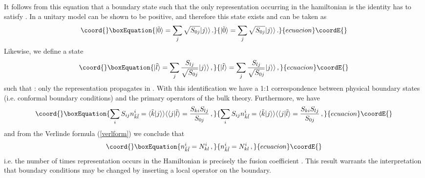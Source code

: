 \documentclass[a4paper,12pt]{report}
\begin{document}
It follows from this equation that a boundary state \coordHE{} such that the only representation
occurring in the hamiltonian \coordHE{} is the identity
\coordHE{} has to satisfy \coordHE{}.
In a unitary model \coordHE{} can be shown to be positive, and therefore this state exists and can be taken as
\begin{equation}\coord{}\boxEquation{
|\tilde{0}\rangle=\sum_{j}\sqrt{S_{0j}}|j\rangle\rangle\,.
}{
|\tilde{0}\rangle=\sum_{j}\sqrt{S_{0j}}|j\rangle\rangle\,.
}{ecuacion}\coordE{}\end{equation}
Likewise, we define a state
\begin{equation}\coord{}\boxEquation{\label{bstates}
|\tilde{l}\rangle=\sum_{j}\frac{S_{lj}}{\sqrt{S_{0j}}}|j\rangle\rangle\,,
}{|\tilde{l}\rangle=\sum_{j}\frac{S_{lj}}{\sqrt{S_{0j}}}|j\rangle\rangle\,,
}{ecuacion}\coordE{}\end{equation}
such that \coordHE{}: only the representation \coordHE{} propagates in
\coordHE{}. With this identification we have a 1:1 correspondence between physical boundary states
(i.e. conformal boundary conditions) and the primary operators of the bulk theory. Furthermore, we have
\begin{equation}\coord{}\boxEquation{
\sum_{i}S_{ij}n_{\tilde{k}\tilde{l}}^{i}=\langle\tilde{k}|j\rangle\rangle\langle\langle
j|\tilde{l}\rangle=\frac{S_{ki}S_{lj}}{S_{0j}}\,,
}{
\sum_{i}S_{ij}n_{\tilde{k}\tilde{l}}^{i}=\langle\tilde{k}|j\rangle\rangle\langle\langle
j|\tilde{l}\rangle=\frac{S_{ki}S_{lj}}{S_{0j}}\,,
}{ecuacion}\coordE{}\end{equation}
and from the Verlinde formula (\ref{verlform}) we conclude that
\begin{equation}\coord{}\boxEquation{
n_{\tilde{k}\tilde{l}}^{i}=N_{kl}^{i}\,,
}{
n_{\tilde{k}\tilde{l}}^{i}=N_{kl}^{i}\,,
}{ecuacion}\coordE{}\end{equation}
i.e. the number of times representation \coordHE{} occurs in the Hamiltonian \coordHE{} is precisely the
fusion coefficient \coordHE{}. This result warrants the interpretation that boundary conditions may be changed
by inserting a local operator on the boundary.
\end{document}

